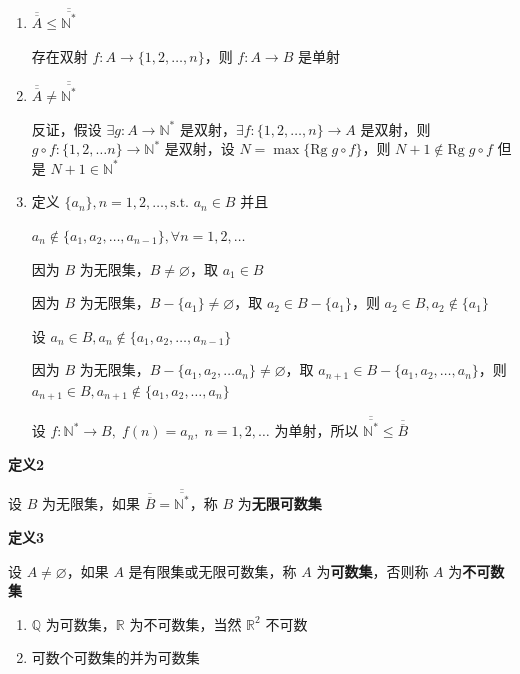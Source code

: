 \begin{enumerate}
\def\labelenumi{\arabic{enumi}.}
\item
  \(\overline{\overline{A}}\leq\overline{\overline{\mathbb{N}^*}}\)

  存在双射 \(f:A\to \{ 1,2,\dots, n \}\)，则 \(f:A \to B\) 是单射
\item
  \(\overline{\overline{A}}\neq\overline{\overline{\mathbb{N}^*}}\)

  反证，假设 \(\exists g:A\to\mathbb{N}^*\)
  是双射，\(\exists f:\{ 1,2,\dots,n\}\to A\) 是双射，则
  \(g\circ f:\{ 1,2,\dots n \}\to\mathbb{N}^*\) 是双射，设
  \(N=\max\{\mathrm{Rg} \; g\circ f\}\)，则
  \(N+1\not\in \mathrm{Rg} \; g\circ f\) 但是 \(N+1\in\mathbb{N}^*\)
\item
  定义 \(\{ a_{n} \},n=1,2,\dots,\text{s.t. } a_{n}\in B\) 并且

  \(a_{n}\not\in\{ a_{1},a_{2},\dots,a_{n-1} \}, \forall n=1,2,\dots\)

  因为 \(B\) 为无限集，\(B\neq\varnothing\)，取 \(a_{1}\in B\)

  因为 \(B\) 为无限集，\(B-\{a_{1}\}\neq\varnothing\)，取
  \(a_{2}\in B-\{ a_{1} \}\)，则 \(a_{2}\in B,a_{2}\not\in \{ a_{1} \}\)

  设 \(a_{n}\in B,a_{n}\not\in \{ a_{1},a_{2},\dots,a_{n-1} \}\)

  因为 \(B\)
  为无限集，\(B-\{ a_{1},a_{2},\dots a_{n} \}\neq \varnothing\)，取
  \(a_{n+1} \in B-\{ a_{1},a_{2},\dots,a_{n} \}\)，则
  \(a_{n+1} \in B, a_{n+1} \not\in \{ a_{1},a_{2},\dots,a_{n} \}\)

  设 \(f:\mathbb{N}^*\to B, \; f(n)=a_{n}, \; n=1,2,\dots\) 为单射，所以
  \(\overline{\overline{\mathbb{N}^*}}\leq\overline{\overline{B}}\)
\end{enumerate}

\textbf{定义2}

设 \(B\) 为无限集，如果
\(\overline{\overline{B}}=\overline{\overline{\mathbb{N}^*}}\)，称 \(B\)
为\textbf{无限可数集}

\textbf{定义3}

设 \(A\neq\varnothing\)，如果 \(A\) 是有限集或无限可数集，称 \(A\)
为\textbf{可数集}，否则称 \(A\) 为\textbf{不可数集}

\begin{enumerate}
\def\labelenumi{\arabic{enumi}.}
\tightlist
\item
  \(\mathbb{Q}\) 为可数集，\(\mathbb{R}\) 为不可数集，当然
  \(\mathbb{R}^2\) 不可数
\item
  可数个可数集的并为可数集
\end{enumerate}

